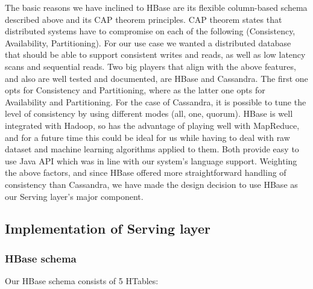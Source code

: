 \documentclass{lmproj}
\begin{document}
The basic reasons we have inclined to HBase are its flexible column-based schema described above and its CAP theorem principles. CAP theorem states that distributed systems have to compromise on each of the following (Consistency, Availability, Partitioning). For our use case we wanted a distributed database that should be able to support consistent writes and reads, as well as low latency scans and sequential reads. Two big players that align with the above features, and also are well tested and documented, are HBase and Cassandra. The first one opts for Consistency and Partitioning, where as the latter one opts for Availability and Partitioning. For the case of Cassandra, it is possible to tune the level of consistency by using different modes (all, one, quorum). HBase is well integrated with Hadoop, so has the advantage of playing well with MapReduce, and for a future time this could be ideal for us while having to deal with raw dataset and machine learning algorithms applied to them. Both provide easy to use Java API which was in line with our system's language support. Weighting the above factors, and since HBase offered more straightforward handling of consistency than Cassandra, we have made the design decision to use HBase as our Serving layer's major component. 


\subsection{Implementation of Serving layer}


\subsubsection{HBase schema}
Our HBase schema consists of 5 HTables:
\end{document}
